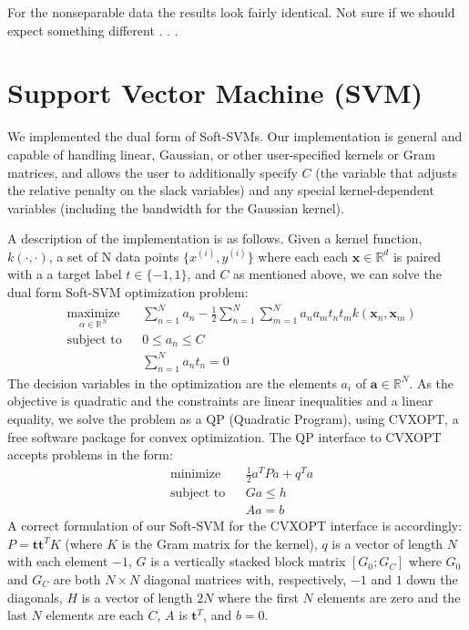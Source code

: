 \documentclass[10pt]{article}
\begin{document}
For the nonseparable data the results look fairly identical. Not sure if we should expect something different . . . 


\section{Support Vector Machine (SVM)}

We implemented the dual form of Soft-SVMs.  Our implementation is general and capable of handling linear, Gaussian, or other user-specified kernels or Gram matrices, and allows the user to additionally specify $C$ (the variable that adjusts the relative penalty on the slack variables) and any special kernel-dependent variables (including the bandwidth for the Gaussian kernel).  

A description of the implementation is as follows.  Given a kernel function, $k(\cdot,\cdot)$, a set of N data points $\{x^{(i)}, y^{(i)}\}$ where each each $\mathbf{x} \in \mathbb{R}^d$ is paired with a a target label $t \in \{-1,1\}$, and $C$ as mentioned above, we can solve the dual form Soft-SVM optimization problem:
%
\begin{equation}
\begin{aligned}
& \underset{\alpha \in \mathbb{R}^N}{\text{maximize}} && \sum_{n=1}^N a_n - \frac{1}{2} \sum_{n=1}^N \sum_{m=1}^N a_na_mt_nt_mk(\mathbf{x}_n, \mathbf{x}_m)\\
& \text{subject to}
&& 0 \le a_n \le C \\
&&&\sum_{n=1}^N a_nt_n = 0
\end{aligned}
\end{equation}
%
The decision variables in the optimization are the elements $a_i$ of $\mathbf{a} \in \mathbb{R}^N$.  As the objective is quadratic and the constraints are linear inequalities and a linear equality, we solve the problem as a QP (Quadratic Program), using CVXOPT, a free software package for convex optimization.  The QP interface to CVXOPT accepts problems in the form:
\begin{equation}
\begin{aligned}
& \text{minimize} && \frac{1}{2}a^TPa + q^Ta\\
& \text{subject to}
&& Ga \le h \\
&&& Aa = b
\end{aligned}
\end{equation}
A correct formulation of our Soft-SVM for the CVXOPT interface is accordingly: $P = \mathbf{t}\mathbf{t}^T K$ (where $K$ is the Gram matrix for the kernel), $q$ is a vector of length $N$ with each element $-1$, $G$ is a vertically stacked block matrix $[G_0; G_C]$ where $G_0$ and $G_C$ are both $N \times N$ diagonal matrices with, respectively, $-1$ and $1$ down the diagonals,  $H$ is a vector of length $2N$ where the first $N$ elements are zero and the last $N$ elements are each $C$, $A$ is $\mathbf{t}^T$, and $b = 0$.
\end{document}
